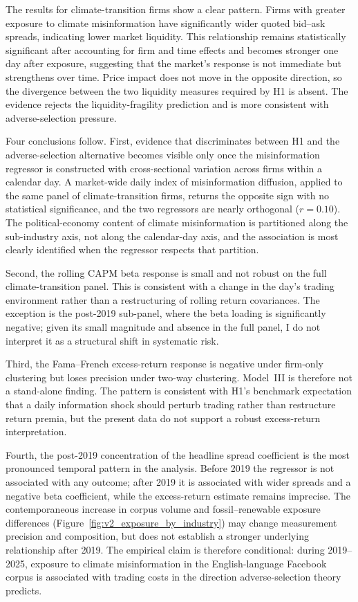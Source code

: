 \documentclass{article}
\theoremstyle{plain}
\begin{document}
The results for climate-transition firms show a clear pattern. Firms with greater exposure to climate misinformation have significantly wider quoted bid--ask spreads, indicating lower market liquidity. This relationship remains statistically significant after accounting for firm and time effects and becomes stronger one day after exposure, suggesting that the market's response is not immediate but strengthens over time. Price impact does not move in the opposite direction, so the divergence between the two liquidity measures required by H1 is absent. The evidence rejects the liquidity-fragility prediction and is more consistent with adverse-selection pressure.

Four conclusions follow. First, evidence that discriminates between H1 and the adverse-selection alternative becomes visible only once the misinformation regressor is constructed with cross-sectional variation across firms within a calendar day. A market-wide daily index of misinformation diffusion, applied to the same panel of climate-transition firms, returns the opposite sign with no statistical significance, and the two regressors are nearly orthogonal ($r=0.10$). The political-economy content of climate misinformation is partitioned along the sub-industry axis, not along the calendar-day axis, and the association is most clearly identified when the regressor respects that partition.

Second, the rolling CAPM beta response is small and not robust on the full climate-transition panel. This is consistent with a change in the day's trading environment rather than a restructuring of rolling return covariances. The exception is the post-2019 sub-panel, where the beta loading is significantly negative; given its small magnitude and absence in the full panel, I do not interpret it as a structural shift in systematic risk.

Third, the Fama--French excess-return response is negative under firm-only clustering but loses precision under two-way clustering. Model~III is therefore not a stand-alone finding. The pattern is consistent with H1's benchmark expectation that a daily information shock should perturb trading rather than restructure return premia, but the present data do not support a robust excess-return interpretation.

Fourth, the post-2019 concentration of the headline spread coefficient is the most pronounced temporal pattern in the analysis. Before 2019 the regressor is not associated with any outcome; after 2019 it is associated with wider spreads and a negative beta coefficient, while the excess-return estimate remains imprecise. The contemporaneous increase in corpus volume and fossil--renewable exposure differences (Figure~\ref{fig:v2_exposure_by_industry}) may change measurement precision and composition, but does not establish a stronger underlying relationship after 2019. The empirical claim is therefore conditional: during 2019--2025, exposure to climate misinformation in the English-language Facebook corpus is associated with trading costs in the direction adverse-selection theory predicts.
\end{document}
